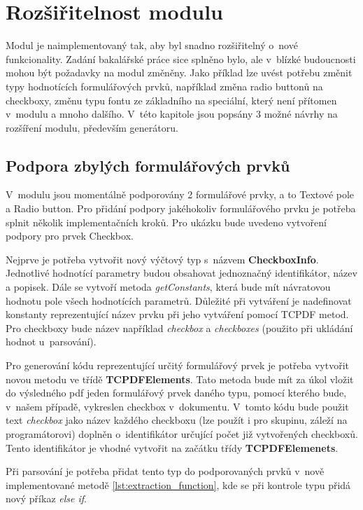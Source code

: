 \chapter{Rozšiřitelnost modulu}
Modul je naimplementovaný tak, aby byl snadno rozšiřitelný o~nové funkcionality. Zadání bakalářské práce sice splněno bylo, ale v~blízké budoucnosti mohou být požadavky na modul změněny. Jako příklad lze uvést potřebu změnit typy hodnotících formulářových prvků, například změna radio buttonů na checkboxy, změnu typu fontu ze základního na speciální, který není přítomen v~modulu a mnoho dalšího. V~této kapitole jsou popsány 3 možné návrhy na rozšíření modulu, především generátoru.

\section{Podpora zbylých formulářových prvků}
V~modulu jsou momentálně podporovány 2 formulářové prvky, a to Textové pole a Radio button. Pro přidání podpory jakéhokoliv formulářového prvku je potřeba splnit několik implementačních kroků. Pro ukázku bude uvedeno vytvoření podpory pro prvek Checkbox.
\par
Nejprve je potřeba vytvořit nový výčtový typ s~názvem \textbf{CheckboxInfo}. Jednotlivé hodnotící parametry budou obsahovat jednoznačný identifikátor, název a popisek. Dále se vytvoří metoda \textit{getConstants}, která bude mít návratovou hodnotu pole všech hodnotících parametrů. Důležité při vytváření je nadefinovat konstanty reprezentující název prvku při jeho vytváření pomocí TCPDF metod. Pro checkboxy bude název například \textit{checkbox} a \textit{checkboxes} (použito při ukládání hodnot u~parsování).
\par
Pro generování kódu reprezentující určitý formulářový prvek je potřeba vytvořit novou metodu ve třídě \textbf{TCPDFElements}. Tato metoda bude mít za úkol vložit do výsledného pdf jeden formulářový prvek daného typu, pomocí kterého bude, v~našem případě, vykreslen checkbox v~dokumentu. V~tomto kódu bude použit text \textit{checkbox} jako název každého checkboxu (lze použít i pro skupinu, záleží na programátorovi) doplněn o~identifikátor určující počet již vytvořených checkboxů. Tento identifikátor je vhodné vytvořit na začátku třídy \textbf{TCPDFElemenets}.
\par
Při parsování je potřeba přidat tento typ do podporovaných prvků v~nově implementované metodě \ref{lst:extraction_function}, kde se při kontrole typu přidá nový příkaz \textit{else if}.
\par
